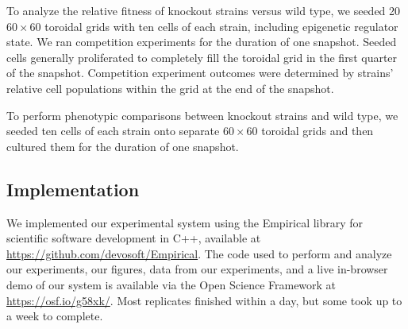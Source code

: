 To analyze the relative fitness of knockout strains versus wild type, we seeded 20 $60 \times 60$ toroidal grids with ten cells of each strain, including epigenetic regulator state.
We ran competition experiments for the duration of one snapshot.
Seeded cells generally proliferated to completely fill the toroidal grid in the first quarter of the snapshot.
Competition experiment outcomes were determined by strains' relative cell populations within the grid at the end of the snapshot.

To perform phenotypic comparisons between knockout strains and wild type, we seeded ten cells of each strain onto separate $60 \times 60$ toroidal grids and then cultured them for the duration of one snapshot.

\subsection{Implementation} \label{sup:implementation}

We implemented our experimental system using the Empirical library for scientific software development in C++, available at \url{https://github.com/devosoft/Empirical}.
The code used to perform and analyze our experiments, our figures, data from our experiments, and a live in-browser demo of our system is available via the Open Science Framework at \url{https://osf.io/g58xk/}.
Most replicates finished within a day, but some took up to a week to complete.
